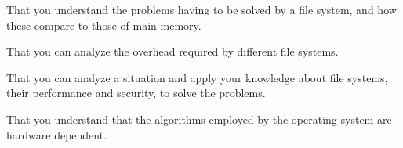 \item That you understand the problems having to be solved by a file system, 
and how these compare to those of main memory.
\item That you can analyze the overhead required by different file systems.
\item That you can analyze a situation and apply your knowledge about file 
systems, their performance and security, to solve the problems.
\item That you understand that the algorithms employed by the operating system 
are hardware dependent.
